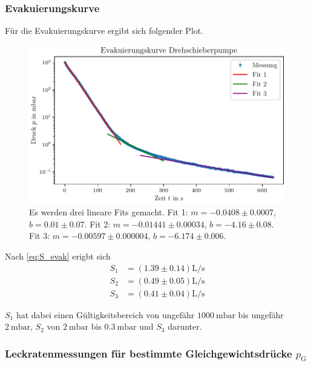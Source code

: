 \subsubsection{Evakuierungskurve}

Für die Evakuierungskurve ergibt sich folgender Plot.

\begin{figure}[H]
    \centering
    \includegraphics[width=\textwidth]{plots/DP_Evakuierungskurve.pdf}
    \caption{Es werden drei lineare Fits gemacht. Fit 1: $m = \num{-0.0408} \pm \num{0.0007}$, $b = \num{0.01} \pm \num{0.07}$. Fit 2: $m = \num{-0.01441} \pm \num{0.00034}$, $b = \num{-4.16} \pm \num{0.08}$. Fit 3: $m = \num{-0.00597} \pm \num{0.000004}$, $b = \num{-6.174} \pm \num{0.006}$.}
    \label{fig:DP_evak}
\end{figure}

Nach \eqref{eq:S_evak} erigbt sich
\begin{align}
    S_1 &= (\num{1.39} \pm \num{0.14}) \si{\liter\per\second} \\
    S_2 &= (\num{0.49} \pm \num{0.05}) \si{\liter\per\second} \\
    S_3 &= (\num{0.41} \pm \num{0.04}) \si{\liter\per\second} 
\end{align}

$S_1$ hat dabei einen Gültigkeitsbereich von ungefähr $\SI{1000}{\milli\bar}$ bis ungefähr $\SI{2}{\milli\bar}$, $S_2$ von $\SI{2}{\milli\bar}$ bis $\SI{0.3}{\milli\bar}$ und $S_3$ darunter.

\subsubsection{Leckratenmessungen für bestimmte Gleichgewichtsdrücke $p_\text{G}$}


